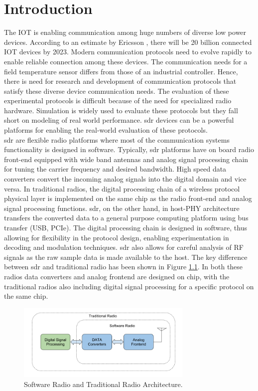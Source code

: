 \chapter{Introduction}
The \ac{IOT} is enabling communication among huge numbers of diverse low power devices.  
According to an estimate by Ericsson \cite{noauthor_internet_2017}, there will be 20 billion connected \ac{IOT} devices by 2023.
Modern communication protocols need to evolve rapidly to enable reliable connection among these devices.
The communication needs for a field temperature sensor differs from those of an industrial controller. 
Hence, there is need for research and development of communication protocols that satisfy these diverse device communication needs. 
The evaluation of these experimental protocols is difficult because of the need for specialized radio hardware.
Simulation is widely used to evaluate these protocols but they fall short on modeling of real world performance.
\ac{sdr} devices can be a powerful platforms for enabling the real-world evaluation of these protocols.\\

\ac{sdr} are flexible radio platforms where most of the communication systems functionality is designed in software. Typically, \ac{sdr} platforms have on board radio front-end equipped with wide band antennas and analog signal processing chain for tuning the carrier frequency and desired bandwidth. High speed data converters convert the incoming analog signals into the digital domain and vice versa. In traditional radios, the digital processing chain of a wireless protocol physical layer is implemented on the same chip as the radio front-end and analog signal processing functions. \ac{sdr}, on the other hand, in host-PHY \cite{nychis_enabling_nodate} architecture transfers the converted data to a general purpose computing platform using bus transfer (USB, PCIe). The digital processing chain is designed in software, thus allowing for flexibility in the protocol design, enabling experimentation in decoding and modulation techniques. \ac{sdr} also allows for careful analysis of RF signals as the raw sample data is made available to the host.
The key difference between \ac{sdr} and traditional radio has been shown in Figure \ref{sdr_architecture}. In both these radios data converters and analog frontend are designed on chip, with the traditional radios also including digital signal processing for a specific protocol on the same chip.
\\

\begin{figure}[!h]
\centering
\includegraphics[width=0.75\textwidth]{Figure/SDRSystem.png}
\caption{Software Radio and Traditional Radio Architecture.}
\label{sdr_architecture}
\end{figure}


